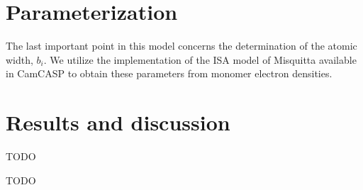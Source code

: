 \documentclass[journal=jacsat,manuscript=article]{achemso}
\begin{document}
\section*{Parameterization}

The last important point in this model concerns the determination of the
atomic width, $b_i$. We utilize the implementation of the ISA model of
Misquitta\cite{misquitta2014distributed} available in CamCASP\cite{misquitta2016ab}
to obtain these parameters from monomer electron densities.

\section*{Results and discussion}



\begin{acknowledgement}

TODO

\end{acknowledgement}

\begin{suppinfo}

TODO

\end{suppinfo}


\end{document}
